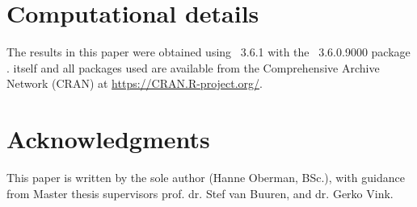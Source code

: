 \documentclass[article]{jss}
\begin{document}

\section*{Computational details}

The results in this paper were obtained using ~3.6.1 \cite{R} with the ~3.6.0.9000 package \cite{mice}.  itself and all packages used are available from the Comprehensive  Archive Network (CRAN) at \url{https://CRAN.R-project.org/}.


\section*{Acknowledgments}

This paper is written by the sole author (Hanne Oberman, BSc.), with guidance from Master thesis supervisors prof. dr. Stef van Buuren, and dr. Gerko Vink.







\newpage

\begin{appendix}

\end{appendix}

\end{document}
